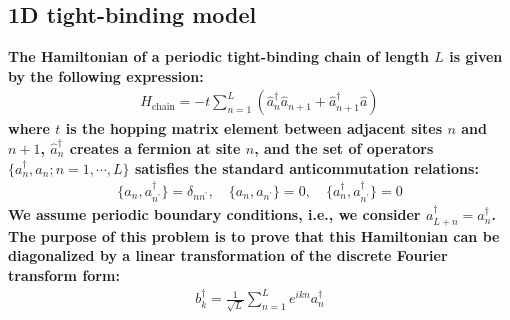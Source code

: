 \documentclass[../../main.tex]{subfiles}
\begin{document}
\subsection{1D tight-binding model}
\textbf{The Hamiltonian of a periodic tight-binding chain of length $L$ is given by the following expression:%
\begin{align*}
  H_{\text{chain}} = -t\sum_{n = 1}^{L}\left(\hat{a}_{n}^{\dagger}\hat{a}_{n+1} + \hat{a}_{n+1}^{\dagger}\hat{a}\right)
\end{align*}
where $t$ is the hopping matrix element between adjacent sites $n$ and $n + 1$, $\hat{a}_{n}^{\dagger}$ creates a fermion at site $n$, and the set of operators $\{a_{n}^{\dagger}, a_{n}; n = 1,\cdots, L\}$ satisfies the standard anticommutation relations: %
\begin{align*}
  \{a_{n},a_{n^{\prime}}^{\dagger}\} = \delta_{nn^{\prime}},\quad \{a_{n},a_{n^{\prime}}\} = 0,\quad \{a_{n}^{\dagger},a_{n^{\prime}}^{\dagger}\} = 0
\end{align*}
We assume periodic boundary conditions, i.e., we consider $a_{L+n}^{\dagger} = a_{n}^{\dagger}$.%
The purpose of this problem is to prove that this Hamiltonian can be diagonalized by a linear transformation of the discrete Fourier transform form:%
\begin{align*}
  b^{\dagger}_{k} = \frac{1}{\sqrt{L}}\sum_{n = 1}^{L}e^{ikn}a_{n}^{\dagger}
\end{align*}}
\end{document}
